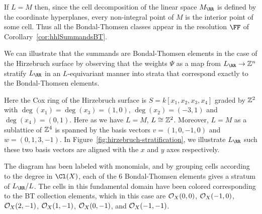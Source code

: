 \documentclass{amsart}
\begin{document}
%
%

\begin{example}
If $L=M$ then, since the cell decomposition of the linear space $M_{\RR}$ is defined by the coordinate
hyperplanes, every non-integral point of $M$ is the interior point of some cell. Thus all  the Bondal-Thomsen classes appear in the resolution $\FF$ of Corollary~\ref{cor:hhlSummandsBT}.

\label{ex:resHirzebruch3} 
  We can illustrate that the summands are Bondal-Thomsen elements in the case of the Hirzebruch surface by observing that the weights $\Psi$ as a map from $L_{\RR} \rightarrow \ZZ^n$ stratify $L_{\RR}$ in an $L$-equivariant manner into strata that correspond exactly to the Bondal-Thomsen elements.

  Here the Cox ring of the Hirzebruch surface is $S=k[x_1,x_2,x_3,x_4]$ graded by $\mathbb Z^2$ with $\deg(x_1)=\deg(x_3) = (1,0)$, $\deg(x_2)=(-3,1)$ and $\deg(x_4)=(0,1)$. Here as we have $L=M$, $L\cong \mathbb Z^2$. Moreover, $L=M$ as a sublattice of $\mathbb Z^4$ is spanned by the basis vectors $v=(1,0,-1,0)$ and $w=(0,1,3,-1)$. In Figure~\ref{fig:hirzebruch-stratification}, we illustrate $L_{\RR}$ such these two basis vectors are aligned with the $x$ and $y$ axes respectively.
\end{example}
  
The diagram has been labeled with monomials, and by grouping cells according to the degree in $\Cl(X)$, each of the 6 Bondal-Thomsen elements gives a stratum of $L_{\RR}/L$.
The cells in this fundamental domain have been colored corresponding to the BT collection elements, which in this case are ${\mathcal O}_{X}(0,0)$, ${\mathcal O}_{X}(-1,0)$, ${\mathcal O}_{X}(2,-1)$, ${\mathcal O}_{X}(1,-1)$, ${\mathcal O}_{X}(0,-1)$, and ${\mathcal O}_{X}(-1,-1)$.
\end{document}

